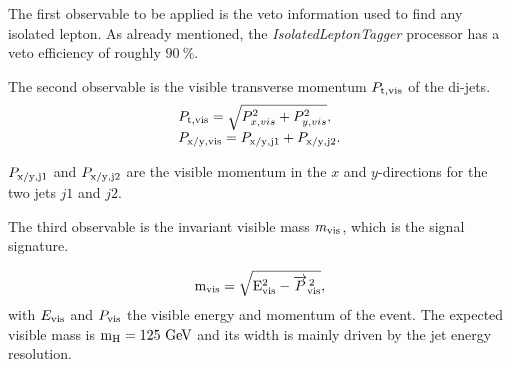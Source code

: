   The first observable to be applied is the veto information used to find any isolated lepton.
  As already mentioned, the \textit{IsolatedLeptonTagger} processor has a veto efficiency of roughly $90~\%$. 

  The second observable is the visible transverse momentum $P_{\rm{t,vis}}$ of the di-jets. 
  \begin{equation}
    \begin{array}{lcl}
      P_{\rm{t,vis}} = \sqrt{P^2_{x,vis} + P^2_{y,vis}}, \\
      P_{\rm{x/y,vis}} = P_{\rm{x/y,j1}} + P_{\rm{x/y,j2}}. 
    \end{array}
  \end{equation}
 
  $ P_{\rm{x/y,j1}}$ and $ P_{\rm{x/y,j2}}$ are the visible momentum in the $x$ and $y$-directions for the two jets $j1$ and $j2$.

  The third observable is the invariant visible mass $m_{\rm{vis}}$, which is the signal signature.

  \begin{equation}
   \rm{m_{vis}} = \sqrt{E^2_{\rm{vis}} - \overrightarrow{P}^{\,2}_{\rm{vis}}},
  \end{equation}
  with $E_{\rm{vis}}$ and $P_{\rm{vis}}$ the visible energy and momentum of the event.
  The expected visible mass is $\rm{m_H} = 125~\rm{GeV}$ and its width is mainly driven by the jet energy resolution.

